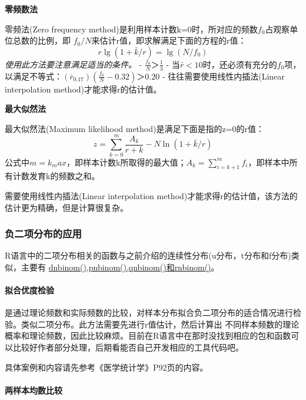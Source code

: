 \documentclass[
]{article}
\begin{document}
\textbf{零频数法}

零频法(Zero frequency method)是利用样本计数k=0时，所对应的频数\(f_0\)占观察单位总数的比例，即
\(f_0/N\)来估计r值，即求解满足下面的方程的r值：
\[r\lg(1+\bar{k}/r)=\lg(N/f_0)\]
\emph{使用此方法要注意满足适当的条件。}
- \(\frac{f_0}{N}＞\frac{1}{3}\)
- 当\(\bar{r}<10\)时，还必须有充分的\(f_0\)项，以满足不等式：\((\bar{r}_0.17)(\frac{f_0}{N}-0.32)＞0.20\)
- 往往需要使用线性内插法(Linear interpolation method)才能求得r的估计值。

\textbf{最大似然法}

最大似然法(Maximum likelihood method)是满足下面是指的z=0的r值：
\[z=\sum_{k=0}^m\frac{A_k}{r+k}-N\ln(1+\bar{k}/r)\]
公式中\(m=k_max\)，即样本计数k所取得的最大值；\(A_k=\sum_{i=k+1}^mf_i\)，即样本中所有计数发育k的频数之和。

需要使用线性内插法(Linear interpolation method)才能求得r的估计值，该方法的估计更为精确，但是计算很复杂。

\hypertarget{ux8d1fux4e8cux9879ux5206ux5e03ux7684ux5e94ux7528}{%
\subsubsection{负二项分布的应用}\label{ux8d1fux4e8cux9879ux5206ux5e03ux7684ux5e94ux7528}}

R语言中的二项分布相关的函数与之前介绍的连续性分布(u分布，t分布和f分布)类似，主要有
\href{https://stat.ethz.ch/R-manual/R-devel/library/stats/html/NegBinomial.html}{dnbinom(),pnbinom(),qnbinom()和rnbinom()}。

\hypertarget{ux62dfux5408ux4f18ux5ea6ux68c0ux9a8c}{%
\paragraph{拟合优度检验}\label{ux62dfux5408ux4f18ux5ea6ux68c0ux9a8c}}

是通过理论频数和实际频数的比较，对样本分布拟合负二项分布的适合情况进行检验。类似二项分布。此方法需要先进行r值估计，然后计算出
不同样本频数的理论概率和理论频数，因此比较麻烦。目前在R语言中在那时没找到相应的包和函数可以比较好作者部分处理，后期看能否自己开发相应的工具代码吧。

具体案例和内容请先参考《医学统计学》P92页的内容。

\hypertarget{ux4e24ux6837ux672cux5747ux6570ux6bd4ux8f83}{%
\paragraph{两样本均数比较}\label{ux4e24ux6837ux672cux5747ux6570ux6bd4ux8f83}}
\end{document}
